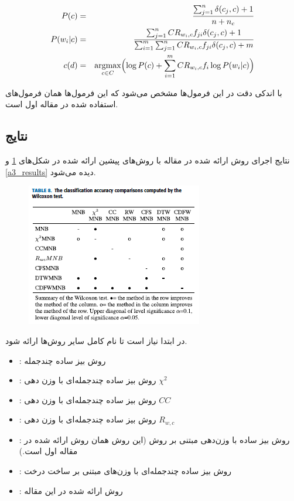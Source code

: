 \documentclass[12pt, a4paper]{article}
\DeclareMathOperator*{\argmax}{argmax}
\begin{document}
\begin{eqnarray}
    P(c) & = & \frac{\sum_{j=1}^{n}\delta(c_j, c) + 1}{n+n_c} \\
    P(w_i|c) & = & \frac{\sum_{j=1}^{n} CR_{w_i,c}f_{ji}\delta(c_j, c) + 1}{\sum_{i=1}^{m}\sum_{j=1}^{n} CR_{w_i,c} f_{ji}\delta(c_j,c)+m} \\
    c(d) & = & \argmax_{c \in C} \Bigl(\log P(c) + \sum_{i=1}^{m} CR_{w_i,c} f_i \log P(w_i| c)\Bigr)
\end{eqnarray}

با اندکی دقت در این فرمول‌ها مشخص می‌شود که این فرمول‌ها همان فرمول‌های استفاده شده
در مقاله اول است.

\clearpage

\subsection*{نتایج}

نتایج اجرای روش ارائه شده در مقاله با روش‌های پیشین ارائه شده در شکل‌های
\ref{a3_table8} و \ref{a3_results} دیده می‌شود.

\begin{figure}[h]
    \centering
    \includegraphics[scale=0.7]{images/article3/table8.png}
    \caption{}
    \label{a3_table8}
\end{figure}

در ابتدا نیاز است تا نام کامل سایر روش‌ها ارائه شود.

\begin{itemize}
    \item {}: روش بیز ساده چندجمله
    \item {}: روش بیز ساده چندجمله‌ای با وزن دهی $\chi^2$
    \item {}: روش بیز ساده چندجمله‌ای با وزن دهی $CC$
    \item {}: روش بیز ساده چندجمله‌ای با وزن دهی $R_{w,c}$
    \item {}: روش بیز ساده با وزن‌دهی مبتنی بر روش  (این روش
          همان روش ارائه شده در مقاله اول است.)
    \item {}: روش بیز ساده چندجمله‌ای با وزن‌های مبتنی بر ساخت درخت
    \item {}: روش ارائه شده در این مقاله
\end{itemize}
\end{document}

